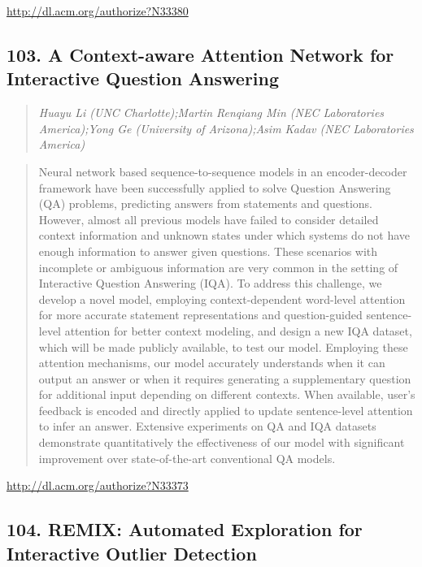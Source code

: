 \documentclass{article}
\begin{document}
\href{http://dl.acm.org/authorize?N33380}{http://dl.acm.org/authorize?N33380}

\subsection{103. A Context-aware Attention Network for Interactive Question Answering}

\begin{quote}
\footnotesize{\textit{Huayu Li (UNC Charlotte);Martin Renqiang Min (NEC Laboratories America);Yong Ge (University of Arizona);Asim Kadav (NEC Laboratories America)}}

\end{quote}

\begin{quote}
Neural network based sequence-to-sequence models in an encoder-decoder framework have been successfully applied to solve Question Answering (QA) problems, predicting answers from statements and questions. However, almost all previous models have failed to consider detailed context information and unknown states under which systems do not have enough information to answer given questions. These scenarios with incomplete or ambiguous information are very common in the setting of Interactive Question Answering (IQA). To address this challenge, we develop a novel model, employing context-dependent word-level attention for more accurate statement representations and question-guided sentence-level attention for better context modeling, and design a new IQA dataset, which will be made publicly available, to test our model. Employing these attention mechanisms, our model accurately understands when it can output an answer or when it requires generating a supplementary question for additional input depending on different contexts. When available, user’s feedback is encoded and directly applied to update sentence-level attention to infer an answer. Extensive experiments on QA and IQA datasets demonstrate quantitatively the effectiveness of our model with significant improvement over state-of-the-art conventional QA models.
\end{quote}

\href{http://dl.acm.org/authorize?N33373}{http://dl.acm.org/authorize?N33373}

\subsection{104. REMIX: Automated Exploration for Interactive Outlier Detection}
\end{document}
